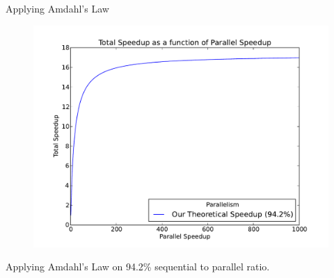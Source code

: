 \documentclass{beamer}
\begin{document}
\begin{frame}{Applying Amdahl's Law}
   \begin{figure}
  \centering \includegraphics[scale=.40]{doc/speedup}
  \end{figure}
Applying Amdahl's Law on 94.2\% sequential to parallel ratio.
\end{frame}
\end{document}
